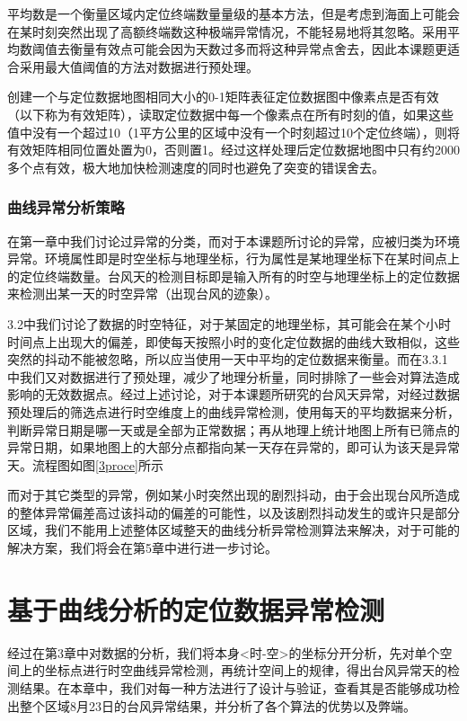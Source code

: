\documentclass[a4paper,AutoFakeBold,oneside,12pt]{book}
\begin{document}
	平均数是一个衡量区域内定位终端数量量级的基本方法，但是考虑到海面上可能会在某时刻突然出现了高额终端数这种极端异常情况，不能轻易地将其忽略。采用平均数阈值去衡量有效点可能会因为天数过多而将这种异常点舍去，因此本课题更适合采用最大值阈值的方法对数据进行预处理。

	创建一个与定位数据地图相同大小的0-1矩阵表征定位数据图中像素点是否有效（以下称为有效矩阵），读取定位数据中每一个像素点在所有时刻的值，如果这些值中没有一个超过10（1平方公里的区域中没有一个时刻超过10个定位终端），则将有效矩阵相同位置处置为0，否则置1。经过这样处理后定位数据地图中只有约2000多个点有效，极大地加快检测速度的同时也避免了突变的错误舍去。

\subsection{曲线异常分析策略}
	在第一章中我们讨论过异常的分类，而对于本课题所讨论的异常，应被归类为环境异常。环境属性即是时空坐标与地理坐标，行为属性是某地理坐标下在某时间点上的定位终端数量。台风天的检测目标即是输入所有的时空与地理坐标上的定位数据来检测出某一天的时空异常（出现台风的迹象）。

	3.2中我们讨论了数据的时空特征，对于某固定的地理坐标，其可能会在某个小时时间点上出现大的偏差，即使每天按照小时的变化定位数据的曲线大致相似，这些突然的抖动不能被忽略，所以应当使用一天中平均的定位数据来衡量。而在3.3.1中我们又对数据进行了预处理，减少了地理分析量，同时排除了一些会对算法造成影响的无效数据点。经过上述讨论，对于本课题所研究的台风天异常，对经过数据预处理后的筛选点进行时空维度上的曲线异常检测，使用每天的平均数据来分析，判断异常日期是哪一天或是全部为正常数据；再从地理上统计地图上所有已筛点的异常日期，如果地图上的大部分点都指向某一天存在异常的，即可认为该天是异常天。流程图如图\ref{3proce}所示


	而对于其它类型的异常，例如某小时突然出现的剧烈抖动，由于会出现台风所造成的整体异常偏差高过该抖动的偏差的可能性，以及该剧烈抖动发生的或许只是部分区域，我们不能用上述整体区域整天的曲线分析异常检测算法来解决，对于可能的解决方案，我们将会在第5章中进行进一步讨论。


\chapter{基于曲线分析的定位数据异常检测}
	经过在第3章中对数据的分析，我们将本身<时-空>的坐标分开分析，先对单个空间上的坐标点进行时空曲线异常检测，再统计空间上的规律，得出台风异常天的检测结果。在本章中，我们对每一种方法进行了设计与验证，查看其是否能够成功检出整个区域8月23日的台风异常结果，并分析了各个算法的优势以及弊端。
\end{document}
